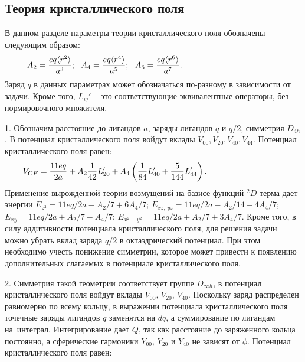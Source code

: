 \subsection{Теория кристаллического поля}
В данном разделе параметры теории кристаллического поля обозначены следующим образом:
\begin{equation*}
\begin{aligned}
& A_2 = \dfrac{eq \langle r^2 \rangle}{a^3};\,\,\,\, A_4 =\dfrac{eq \langle r^4 \rangle}{a^5};\,\,\,\, A_6 =\dfrac{eq \langle r^6 \rangle}{a^7}. \hspace{38mm}
\end{aligned}
\end{equation*}
Заряд $q$ в данных параметрах может обозначаться по-разному в зависимости от задачи. Кроме того, $L_{ij}'$ – это соответствующие эквивалентные операторы, без нормировочного множителя.\par
1. Обозначим расстояние до лигандов $a$, заряды лигандов $q$ и $q/2$, симметрия $D_{4h}$. В потенциал кристаллического поля войдут вклады $V_{00}, V_{20}, V_{40}, V_{44}$. Потенциал кристаллического поля равен:
\begin{equation*}
\begin{aligned}
& V_{CF}= \dfrac{11eq}{2a} + A_2 \dfrac{1}{42}L_{20}' + A_4 \left(\dfrac{ 1}{84}L_{40}'  + \dfrac{5 }{144}L_{44}'\right). \hspace{29mm}
\end{aligned}
\end{equation*}
Применение вырожденной теории возмущений на базисе функций $^2D$ терма дает энергии $E_{z^2} = 11eq/2a - A_2/7 + {6A_4}/{7}$; $E_{xz,\, yz} = 11eq/2a -{A_2}/{14} - {4A_4}/{7}$; $E_{xy} = 11eq/2a + {A_2}/{7} - {A_4}/{7}$; $E_{x^2-y^2} = 11eq/2a + {A_2}/{7} + {3A_4}/{7}$. Кроме того, в силу аддитивности потенциала кристаллического поля, для решения задачи можно убрать вклад заряда ${q}/{2}$ в октаэдрический потенциал. При этом необходимо учесть понижение симметрии, которое может привести к появлению дополнительных слагаемых в потенциале кристаллического поля.\par
2. Симметрия такой геометрии соответствует группе $D_{\infty h}$, в потенциал кристаллического поля войдут вклады $V_{00}$, $V_{20}$, $V_{40}$. Поскольку заряд распределен равномерно по всему кольцу, в выражении потенциала кристаллического поля точечные заряды лигандов $q$ заменятся на $dq$, а суммирование по лигандам на~интеграл. Интегрирование дает $Q$, так как расстояние до заряженного кольца постоянно, а сферические гармоники $\textit{Y}_{00}$, $\textit{Y}_{20}$ и  $\textit{Y}_{40}$ не зависят от $\phi$. Потенциал кристаллического поля равен:
